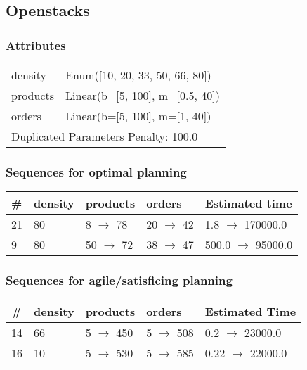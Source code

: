 \documentclass{article}
\begin{document}
                            \newpage \subsection{Openstacks}
                    \subsubsection*{Attributes}
                    \begin{tabular}{@{}p{}p{}@{}}
                    \toprule
                    density & Enum([10, 20, 33, 50, 66, 80])\\
products & Linear(b=[5, 100], m=[0.5, 40])\\
orders & Linear(b=[5, 100], m=[1, 40]) \\
                    \bottomrule
                    \multicolumn{2}{l}{Duplicated Parameters Penalty: 100.0}
                    \end{tabular}
                
                            \subsubsection*{Sequences for optimal planning}

                            \begin{center}
                            \begin{tabular}{@{}l|l|l|l|l@{}}
                            \# & density & products & orders & Estimated time\\\midrule
                            21&80&8 $\rightarrow$ 78&20 $\rightarrow$ 42&1.8 $\rightarrow$ 170000.0\\
9&80&50 $\rightarrow$ 72&38 $\rightarrow$ 47&500.0 $\rightarrow$ 95000.0
                            \end{tabular}
                            \end{center}
                    
                         \subsubsection*{Sequences for agile/satisficing planning}

                        \begin{center}
                        \begin{tabular}{@{}l|l|l|l|l@{}}
                        \# & density & products & orders & Estimated Time\\\midrule
                        14&66&5 $\rightarrow$ 450&5 $\rightarrow$ 508&0.2 $\rightarrow$ 23000.0\\
16&10&5 $\rightarrow$ 530&5 $\rightarrow$ 585&0.22 $\rightarrow$ 22000.0
                        \end{tabular}
                        \end{center}
                    
\end{document}
